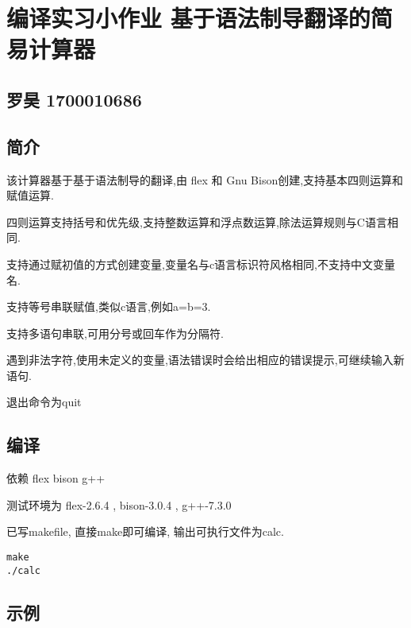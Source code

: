 \hypertarget{ux7f16ux8bd1ux5b9eux4e60ux5c0fux4f5cux4e1a-ux57faux4e8eux8bedux6cd5ux5236ux5bfcux7ffbux8bd1ux7684ux7b80ux6613ux8ba1ux7b97ux5668}{%
\section{编译实习小作业
基于语法制导翻译的简易计算器}\label{ux7f16ux8bd1ux5b9eux4e60ux5c0fux4f5cux4e1a-ux57faux4e8eux8bedux6cd5ux5236ux5bfcux7ffbux8bd1ux7684ux7b80ux6613ux8ba1ux7b97ux5668}}

\hypertarget{ux7f57ux660a-1700010686}{%
\subsection{罗昊 1700010686}\label{ux7f57ux660a-1700010686}}

\hypertarget{ux7b80ux4ecb}{%
\subsection{简介}\label{ux7b80ux4ecb}}

该计算器基于基于语法制导的翻译,由 flex 和 Gnu
Bison创建,支持基本四则运算和赋值运算.

四则运算支持括号和优先级,支持整数运算和浮点数运算,除法运算规则与C语言相同.

支持通过赋初值的方式创建变量,变量名与c语言标识符风格相同,不支持中文变量名.

支持等号串联赋值,类似c语言,例如a=b=3.

支持多语句串联,可用分号或回车作为分隔符.

遇到非法字符,使用未定义的变量,语法错误时会给出相应的错误提示,可继续输入新语句.

退出命令为quit

\hypertarget{ux7f16ux8bd1}{%
\subsection{编译}\label{ux7f16ux8bd1}}

依赖 flex bison g++

测试环境为 flex-2.6.4 , bison-3.0.4 , g++-7.3.0

已写makefile, 直接make即可编译, 输出可执行文件为calc.

\begin{verbatim}
make
./calc
\end{verbatim}

\hypertarget{ux793aux4f8b}{%
\subsection{示例}\label{ux793aux4f8b}}

